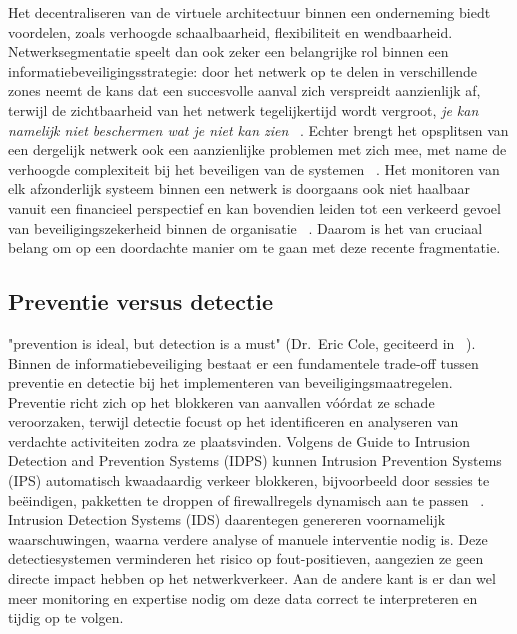 Het decentraliseren van de virtuele architectuur binnen een onderneming biedt voordelen, zoals verhoogde schaalbaarheid, flexibiliteit en wendbaarheid. Netwerksegmentatie speelt dan ook zeker een belangrijke rol binnen een informatiebeveiligingsstrategie: door het netwerk op te delen in verschillende zones neemt de kans dat een succesvolle aanval zich verspreidt aanzienlijk af, terwijl de zichtbaarheid van het netwerk tegelijkertijd wordt vergroot, \textit{je kan namelijk niet beschermen wat je niet kan zien} ~\autocite{Obregon_2015}. Echter brengt het opsplitsen van een dergelijk netwerk ook een aanzienlijke problemen met zich mee, met name de verhoogde complexiteit bij het beveiligen van de systemen ~\autocite{10.1145/3538969.3538986}. Het monitoren van elk afzonderlijk systeem binnen een netwerk is doorgaans ook niet haalbaar vanuit een financieel perspectief en kan bovendien leiden tot een verkeerd gevoel van beveiligingszekerheid binnen de organisatie ~\autocite{Obregon_2015}. Daarom is het van cruciaal belang om op een doordachte manier om te gaan met deze recente fragmentatie.

\subsection{Preventie versus detectie}
"prevention is ideal, but detection is a must" (Dr.\ Eric Cole, geciteerd in ~\autocite{Obregon_2015}). Binnen de informatiebeveiliging bestaat er een fundamentele trade-off tussen preventie en detectie bij het implementeren van beveiligingsmaatregelen. Preventie richt zich op het blokkeren van aanvallen vóórdat ze schade veroorzaken, terwijl detectie focust op het identificeren en analyseren van verdachte activiteiten zodra ze plaatsvinden. Volgens de Guide to Intrusion Detection and Prevention Systems (IDPS) kunnen Intrusion Prevention Systems (IPS) automatisch kwaadaardig verkeer blokkeren, bijvoorbeeld door sessies te beëindigen, pakketten te droppen of firewallregels dynamisch aan te passen ~\autocite{Scarfone_Mell_2007}. Intrusion Detection Systems (IDS) daarentegen genereren voornamelijk waarschuwingen, waarna verdere analyse of manuele interventie nodig is. Deze detectiesystemen verminderen het risico op fout-positieven, aangezien ze geen directe impact hebben op het netwerkverkeer. Aan de andere kant is er dan wel meer monitoring en expertise nodig om deze data correct te interpreteren en tijdig op te volgen. 


